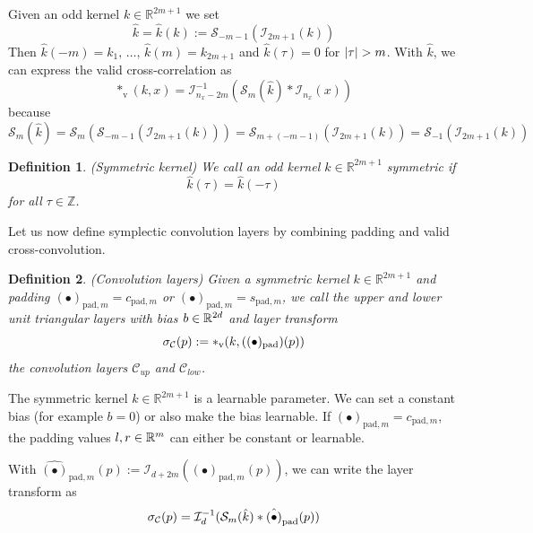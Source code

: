 \documentclass[twoside,a4paper]{article}
\newtheorem{definition}{Definition}
\begin{document}
Given an odd kernel $k \in \mathbb{R}^{2m+1}$ we set
\begin{equation*}
	\hat{k} = \hat{k}(k) := \mathcal{S}_{-m-1}(\mathcal{I}_{2m+1}(k))
\end{equation*}
Then $\hat{k}(-m) = k_1, \, \dots,\, \hat{k}(m) = k_{2m+1}$ and
$\hat{k}(\tau)=0$ for $\left|{\tau}\right| > m$. With $\hat{k}$, we can express the valid cross-correlation as
\begin{equation*}
	*_{\text{v}}(k,x) = \mathcal{I}_{n_x-2m}^{-1} (
		\mathcal{S}_{m}(\hat{k}) * \mathcal{I}_{n_x}(x)
	)
\end{equation*}
because
\begin{equation*}
	\mathcal{S}_{m}(\hat{k}) 
	= \mathcal{S}_{m}(\mathcal{S}_{-m-1}(\mathcal{I}_{2m+1}(k)))
	= \mathcal{S}_{m+(-m-1)}(\mathcal{I}_{2m+1}(k))
	= \mathcal{S}_{-1}(\mathcal{I}_{2m+1}(k))
\end{equation*}

\begin{definition}
	(Symmetric kernel)
	We call an odd kernel $k \in \mathbb{R}^{2m+1}$ symmetric if
	\begin{equation*}
		\hat{k}(\tau) = \hat{k}(-\tau)
	\end{equation*}
	for all $\tau \in \mathbb{Z}$.
\end{definition}

Let us now define symplectic convolution layers by combining padding and valid 
cross-convolution.
\begin{definition}
	(Convolution layers)
	Given a symmetric kernel $k \in \mathbb{R}^{2m+1}$ and padding
	$(\bullet)_{\text{pad},m} = c_{\text{pad},m}$ or $(\bullet)_{\text{pad},m} = s_{\text{pad},m}$,
	we call the upper and lower unit triangular layers with bias $b \in \mathbb{R}^{2d}$ and layer transform
	\begin{equation*}
		\sigma_{\mathcal{C}}(p) := *_{\text{v}}(k,((\bullet)_{\text{pad}})(p))
	\end{equation*}
	the convolution layers $\mathcal{C}_{up}$ and $\mathcal{C}_{low}$.
\end{definition}
The symmetric kernel $k \in \mathbb{R}^{2m+1}$ is a learnable parameter.
We can set a constant bias (for example $b=0$) or also make the bias learnable.
If $(\bullet)_{\text{pad},m} = c_{\text{pad},m}$, the padding values $l,r \in \mathbb{R}^m$ can either
be constant or learnable.

With $\hat{(\bullet)}_{\text{pad},m}(p) := \mathcal{I}_{d+2m}((\bullet)_{\text{pad},m}(p))$,
we can write the layer transform as
\begin{equation}\label{eq_conv_layer_transform}
	\sigma_{\mathcal{C}}(p) =
	\mathcal{I}_{d}^{-1} (
		\mathcal{S}_{m}(\hat{k}) * \hat{(\bullet)}_{\text{pad}}(p)
	)
\end{equation}
\end{document}
